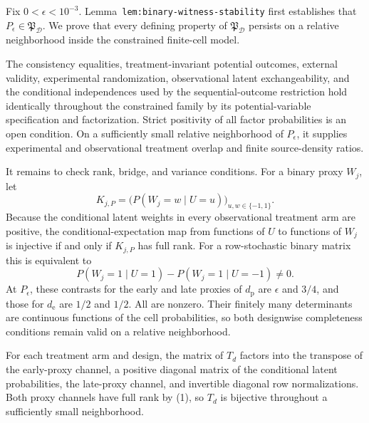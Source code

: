 Fix \(0<\epsilon<10^{-3}\).  Lemma~\texttt{lem:binary-witness-stability} first establishes that \(P_\epsilon\in\mathfrak P_{\mathcal D}\).  We prove that every defining property of \(\mathfrak P_{\mathcal D}\) persists on a relative neighborhood inside the constrained finite-cell model.

The consistency equalities, treatment-invariant potential outcomes, external validity, experimental randomization, observational latent exchangeability, and the conditional independences used by the sequential-outcome restriction hold identically throughout the constrained family by its potential-variable specification and factorization.  Strict positivity of all factor probabilities is an open condition.  On a sufficiently small relative neighborhood of \(P_\epsilon\), it supplies experimental and observational treatment overlap and finite source-density ratios.

It remains to check rank, bridge, and variance conditions.  For a binary proxy \(W_j\), let
\[
 K_{j,P}=\bigl(P(W_j=w\mid U=u)\bigr)_{u,w\in\{-1,1\}}.
\]
Because the conditional latent weights in every observational treatment arm are positive, the conditional-expectation map from functions of \(U\) to functions of \(W_j\) is injective if and only if \(K_{j,P}\) has full rank.  For a row-stochastic binary matrix this is equivalent to
\[
 P(W_j=1\mid U=1)-P(W_j=1\mid U=-1)\ne0. \tag{1}
\]
At \(P_\epsilon\), these contrasts for the early and late proxies of \(d_{\mathrm p}\) are \(\epsilon\) and \(3/4\), and those for \(d_{\mathrm e}\) are \(1/2\) and \(1/2\).  All are nonzero.  Their finitely many determinants are continuous functions of the cell probabilities, so both designwise completeness conditions remain valid on a relative neighborhood.

For each treatment arm and design, the matrix of \(T_d\) factors into the transpose of the early-proxy channel, a positive diagonal matrix of the conditional latent probabilities, the late-proxy channel, and invertible diagonal row normalizations.  Both proxy channels have full rank by (1), so \(T_d\) is bijective throughout a sufficiently small neighborhood.


